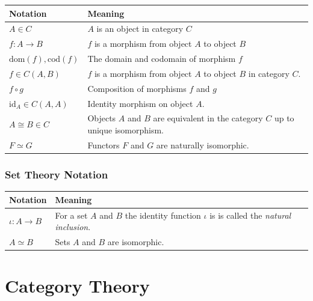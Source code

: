 \documentclass[10pt]{article}
\begin{document}
\begin{center}
  \begin{longtable}{|p{}|p{}|}
    \hline 
    \textbf{Notation} & \textbf{Meaning} \\ \hline 
    $A\in C$ & $A$ is an object in category $C$ \\ \hline
    $f : A \rightarrow B$ & $f$ is a morphism from object $A$ to object $B$ \\ \hline
    $\text{dom}(f), \text{cod}(f)$ & The domain and codomain of morphism $f$ \\ \hline
    $f \in C(A, B)$ & $f$ is a morphism from object $A$ to object $B$ in category $C$.\\ \hline
    $f \circ g $ & Composition of morphisms $f$ and $g$ \\ \hline
    $\text{id}_A \in C(A, A)$ & Identity morphism on object $A$.\\ \hline
    $A \cong B \in C$ & Objects $A$ and $B$ are equivalent in the category $C$ up to unique isomorphism. \\ \hline
    $F \simeq G$ & Functors $F$ and $G$ are naturally isomorphic. \\ \hline
  \end{longtable}
\end{center}

\subsubsection{Set Theory Notation}
\begin{center}
  \begin{longtable}{|p{}|p{}|}
    \hline 
    \textbf{Notation} & \textbf{Meaning} \\ \hline
    $\iota : A \rightarrow B$ & For a set $A$ and $B$ the identity function $\iota$ is is called the \textit{natural inclusion}. \\ \hline 
    $A \simeq B$ & Sets $A$ and $B$ are isomorphic. \\ \hline 
  \end{longtable}
\end{center}

\section{Category Theory}
\end{document}
